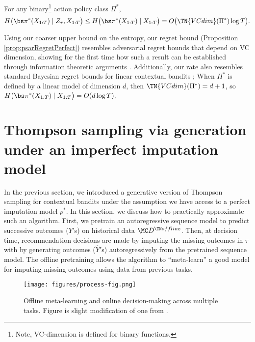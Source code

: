 \begin{lemma}\label{lemma:VC}
    For any binary\footnote{Note, VC-dimension is defined for binary functions.} action policy class $\Pi^*$, 
    \begin{align*}
        H \big( \piX \mid Z_{\tau}, X_{1:T} \big)
        \leq H \big( \piX \mid X_{1:T} \big)
        = O\big( \TN{VCdim}(\Pi^*) \log T \big).
    \end{align*}
\end{lemma}

Using our coarser upper bound on the entropy, our regret bound (Proposition \ref{prop:psarRegretPerfect}) resembles adversarial regret bounds that depend on VC dimension, showing for the first time how such a result can be established through information theoretic arguments \citep{beygelzimer2011contextual}.
Additionally, our rate also resembles standard Bayesian regret bounds for linear contextual bandits \citep{russo2018learning}; When $\Pi^*$ is defined by a linear model of dimension $d$, then $\TN{VCdim}(\Pi^*) = d+1$, so $H \big( \piX \mid X_{1:T} \big) = O(d \log T)$. 


\section{Thompson sampling via generation under an imperfect imputation model}
\label{sec:ourAlg}
In the previous section, we introduced a generative version of Thompson sampling for contextual bandits under the assumption we have access to a perfect imputation model $p^*$. In this section, we discuss how to practically approximate such an algorithm. 
First, we pretrain an autoregressive sequence model to predict successive outcomes ($Y$'s) on historical data $\Dtrain$. Then, at decision time, recommendation decisions are made by imputing the missing outcomes in $\tau$ with by generating outcomes ($\hat{Y}'$s) autoregressively from the pretrained sequence model. The offline pretraining allows the algorithm to ``meta-learn'' a good model for imputing missing outcomes using data from previous tasks.

\begin{figure}[h]
    \centering
    \texttt{[image: figures/process-fig.png]}
    \caption{Offline meta-learning and online decision-making across multiple tasks. Figure is slight modification of one from \citet{psar2024}.}
    \label{fig:process}
\end{figure}


